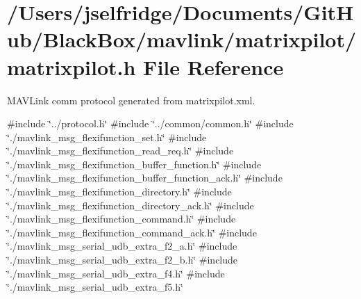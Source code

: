 \section{/\+Users/jselfridge/\+Documents/\+Git\+Hub/\+Black\+Box/mavlink/matrixpilot/matrixpilot.h File Reference}
\label{matrixpilot_8h}


M\+A\+V\+Link comm protocol generated from matrixpilot.\+xml.  


{\ttfamily \#include \char`\"{}../protocol.\+h\char`\"{}}\newline
{\ttfamily \#include \char`\"{}../common/common.\+h\char`\"{}}\newline
{\ttfamily \#include \char`\"{}./mavlink\+\_\+msg\+\_\+flexifunction\+\_\+set.\+h\char`\"{}}\newline
{\ttfamily \#include \char`\"{}./mavlink\+\_\+msg\+\_\+flexifunction\+\_\+read\+\_\+req.\+h\char`\"{}}\newline
{\ttfamily \#include \char`\"{}./mavlink\+\_\+msg\+\_\+flexifunction\+\_\+buffer\+\_\+function.\+h\char`\"{}}\newline
{\ttfamily \#include \char`\"{}./mavlink\+\_\+msg\+\_\+flexifunction\+\_\+buffer\+\_\+function\+\_\+ack.\+h\char`\"{}}\newline
{\ttfamily \#include \char`\"{}./mavlink\+\_\+msg\+\_\+flexifunction\+\_\+directory.\+h\char`\"{}}\newline
{\ttfamily \#include \char`\"{}./mavlink\+\_\+msg\+\_\+flexifunction\+\_\+directory\+\_\+ack.\+h\char`\"{}}\newline
{\ttfamily \#include \char`\"{}./mavlink\+\_\+msg\+\_\+flexifunction\+\_\+command.\+h\char`\"{}}\newline
{\ttfamily \#include \char`\"{}./mavlink\+\_\+msg\+\_\+flexifunction\+\_\+command\+\_\+ack.\+h\char`\"{}}\newline
{\ttfamily \#include \char`\"{}./mavlink\+\_\+msg\+\_\+serial\+\_\+udb\+\_\+extra\+\_\+f2\+\_\+a.\+h\char`\"{}}\newline
{\ttfamily \#include \char`\"{}./mavlink\+\_\+msg\+\_\+serial\+\_\+udb\+\_\+extra\+\_\+f2\+\_\+b.\+h\char`\"{}}\newline
{\ttfamily \#include \char`\"{}./mavlink\+\_\+msg\+\_\+serial\+\_\+udb\+\_\+extra\+\_\+f4.\+h\char`\"{}}\newline
{\ttfamily \#include \char`\"{}./mavlink\+\_\+msg\+\_\+serial\+\_\+udb\+\_\+extra\+\_\+f5.\+h\char`\"{}}\newline

